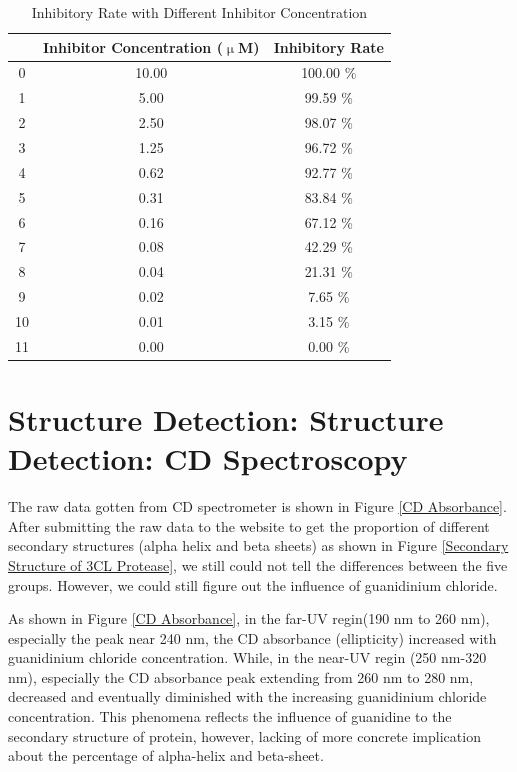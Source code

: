 \documentclass{report}
\begin{document}
\begin{table}
    \centering
    \caption{Inhibitory Rate with Different Inhibitor Concentration}

    \begin{tabular}{|c|c|c|}
        \toprule
         & Inhibitor Concentration ($\upmu$M) & Inhibitory Rate \\
        \midrule
        0 & 10.00 & 100.00 \% \\
        1 & 5.00 & 99.59 \% \\
        2 & 2.50 & 98.07 \% \\
        3 & 1.25 & 96.72 \% \\
        4 & 0.62 & 92.77 \% \\
        5 & 0.31 & 83.84 \% \\
        6 & 0.16 & 67.12 \% \\
        7 & 0.08 & 42.29 \% \\
        8 & 0.04 & 21.31 \% \\
        9 & 0.02 & 7.65 \% \\
        10 & 0.01 & 3.15 \% \\
        11 & 0.00 & 0.00 \% \\
        \bottomrule
        \end{tabular}
    \label{Inhibitory Rate with Different Inhibitor Concentration}            
        
\end{table}


\section{Structure Detection: Structure Detection: CD Spectroscopy}
The raw data gotten from CD spectrometer is shown in Figure \ref{CD Absorbance}.
After submitting the raw data to the website to get the proportion of different secondary structures (alpha helix and beta sheets) as shown in Figure \ref{Secondary Structure of 3CL Protease}, we still could not tell the differences between the five groups.
However, we could still figure out the influence of guanidinium chloride.


As shown in Figure \ref{CD Absorbance}, in the far-UV regin(190 nm to 260 nm), especially the peak near 240 nm, the CD absorbance (ellipticity) increased with guanidinium chloride concentration.
While, in the near-UV regin (250 nm-320 nm), especially the CD absorbance peak extending from 260 nm to 280 nm, decreased and eventually diminished with the increasing guanidinium chloride concentration.
This phenomena reflects the influence of guanidine to the secondary structure of protein, however, lacking of more concrete implication about the percentage of alpha-helix and beta-sheet.
\end{document}
